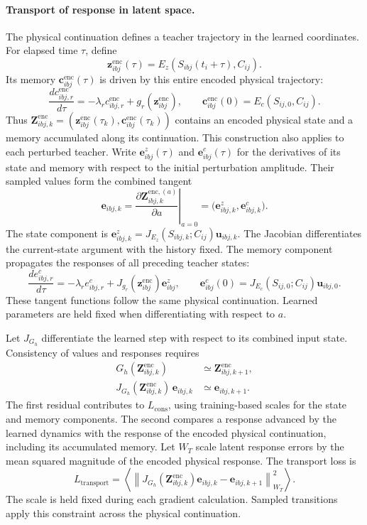 \documentclass[11pt,a4paper]{article}
\newcommand{\norm}[1]{\left\lVert #1\right\rVert}
\newcommand{\avg}[1]{\left\langle #1\right\rangle}
\newcommand{\z}{\mathbf z}
\newcommand{\Z}{\mathbf Z}
\newcommand{\cstate}{\mathbf c}
\begin{document}
\paragraph{Transport of response in latent space.}
The physical continuation defines a teacher trajectory in the learned
coordinates. For elapsed time $\tau$, define
\[
\z^{\mathrm{enc}}_{ibj}(\tau)
=E_z(S_{ibj}(t_i+\tau),C_{ij}).
\]
Its memory $\cstate^{\mathrm{enc}}_{ibj}(\tau)$ is driven by this entire
encoded physical trajectory:
\[
\frac{dc^{\mathrm{enc}}_{ibj,r}}{d\tau}
=-\lambda_r c^{\mathrm{enc}}_{ibj,r}
+g_r(\z^{\mathrm{enc}}_{ibj}),
\qquad
\cstate^{\mathrm{enc}}_{ibj}(0)=E_c(S_{ij,0},C_{ij}).
\]
Thus $\Z^{\mathrm{enc}}_{ibj,k}
=(\z^{\mathrm{enc}}_{ibj}(\tau_k),\cstate^{\mathrm{enc}}_{ibj}(\tau_k))$
contains an encoded physical state and a memory accumulated along its
continuation. This construction also applies to each perturbed teacher.
Write $\mathbf e^z_{ibj}(\tau)$ and $\mathbf e^c_{ibj}(\tau)$ for the
derivatives of its state and memory with respect to the initial perturbation
amplitude. Their sampled values form the combined tangent
\[
\mathbf e_{ibj,k}
=\left.\frac{\partial\Z^{\mathrm{enc},(a)}_{ibj,k}}
{\partial a}\right|_{a=0}
=\bigl(\mathbf e^z_{ibj,k},\mathbf e^c_{ibj,k}\bigr).
\]
The state component is
$\mathbf e^z_{ibj,k}=J_{E_z}(S_{ibj,k};C_{ij})\mathbf u_{ibj,k}$.
The Jacobian differentiates the current-state argument with the history
fixed. The memory component propagates the responses of all preceding
teacher states:
\[
\frac{de^c_{ibj,r}}{d\tau}
=-\lambda_r e^c_{ibj,r}
+J_{g_r}(\z^{\mathrm{enc}}_{ibj})\mathbf e^z_{ibj},
\qquad
\mathbf e^c_{ibj}(0)=J_{E_c}(S_{ij,0};C_{ij})\mathbf u_{ibj,0}.
\]
These tangent functions follow the same physical continuation. Learned
parameters are held fixed when differentiating with respect to $a$.

Let $J_{G_h}$ differentiate the learned step with respect to its combined
input state. Consistency of values and responses requires
\[
\boxed{\begin{aligned}
G_h(\Z^{\mathrm{enc}}_{ibj,k})
&\simeq\Z^{\mathrm{enc}}_{ibj,k+1},\\
J_{G_h}(\Z^{\mathrm{enc}}_{ibj,k})\,\mathbf e_{ibj,k}
&\simeq\mathbf e_{ibj,k+1}.
\end{aligned}}
\]
The first residual contributes to $L_{\mathrm{cons}}$, using training-based
scales for the state and memory components. The second compares a response
advanced by the learned dynamics with the response of the encoded physical
continuation, including its accumulated memory.
Let $W_T$ scale latent response errors by the mean squared magnitude of the
encoded physical response. The transport loss is
\[
L_{\mathrm{transport}}
=\avg{\norm{
J_{G_h}(\Z^{\mathrm{enc}}_{ibj,k})\mathbf e_{ibj,k}
-\mathbf e_{ibj,k+1}}_{W_T}^2}.
\]
The scale is held fixed during each gradient calculation. Sampled transitions
apply this constraint across the physical continuation.
\end{document}
